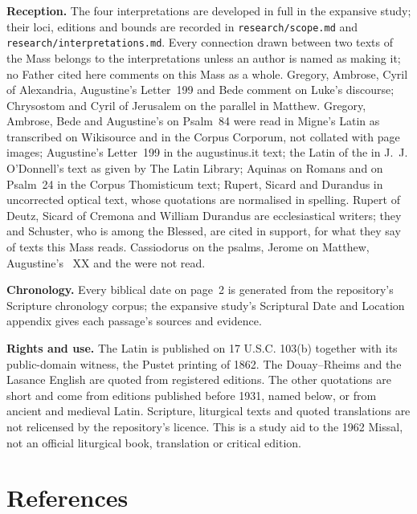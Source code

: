 {\textbf{Reception.} The four interpretations are developed in full in the
expansive study; their loci, editions and bounds are recorded in
\texttt{research/scope.md} and \texttt{research/interpretations.md}. Every
connection drawn between two texts of the Mass belongs to the interpretations
unless an author is named as making it; no Father cited here comments on this
Mass as a whole. Gregory, Ambrose, Cyril of Alexandria, Augustine's
Letter~199 and Bede comment on Luke's discourse; Chrysostom and Cyril of
Jerusalem on the parallel in Matthew. Gregory, Ambrose, Bede and Augustine's
 on Psalm~84 were read in Migne's Latin as transcribed on
Wikisource and in the Corpus Corporum, not collated with page images;
Augustine's Letter~199 in the augustinus.it text; the Latin of the
 in J.~J. O'Donnell's text as given by The Latin Library;
Aquinas on Romans and on Psalm~24 in the Corpus Thomisticum text; Rupert,
Sicard and Durandus in uncorrected optical text, whose quotations are
normalised in spelling.
Rupert of Deutz, Sicard of Cremona and William Durandus are ecclesiastical
writers; they and Schuster, who is among the Blessed, are cited in support,
for what they say of texts this Mass reads. Cassiodorus on the psalms, Jerome
on Matthew, Augustine's ~XX and the  were
not read.

\textbf{Chronology.} Every biblical date on page~2 is generated from the
repository's Scripture chronology corpus; the expansive study's Scriptural
Date and Location appendix gives each passage's sources and evidence.

\textbf{Rights and use.} The Latin is published on 17 U.S.C. 103(b) together
with its public-domain witness, the Pustet printing of 1862. The Douay--Rheims
and the Lasance English are quoted from registered editions. The other
quotations are short and come from editions published before 1931, named
below, or from ancient and medieval Latin. Scripture, liturgical texts and
quoted translations are not relicensed by the repository's licence. This is
a study aid to the 1962 Missal, not an official liturgical book, translation
or critical edition.
\par}

\section{References}

